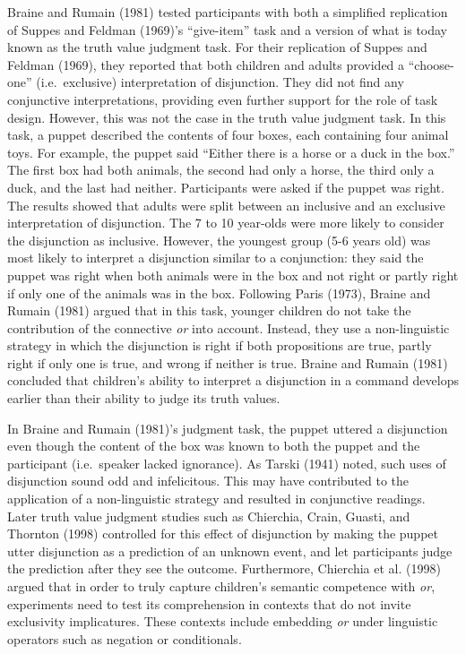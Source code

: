 \documentclass[,man,floatsintext]{apa6}
\begin{document}
Braine and Rumain (1981) tested participants with both a simplified replication of Suppes and Feldman (1969)'s \enquote{give-item} task and a version of what is today known as the truth value judgment task. For their replication of Suppes and Feldman (1969), they reported that both children and adults provided a \enquote{choose-one} (i.e.~exclusive) interpretation of disjunction. They did not find any conjunctive interpretations, providing even further support for the role of task design. However, this was not the case in the truth value judgment task. In this task, a puppet described the contents of four boxes, each containing four animal toys. For example, the puppet said \enquote{Either there is a horse or a duck in the box.} The first box had both animals, the second had only a horse, the third only a duck, and the last had neither. Participants were asked if the puppet was right. The results showed that adults were split between an inclusive and an exclusive interpretation of disjunction. The 7 to 10 year-olds were more likely to consider the disjunction as inclusive. However, the youngest group (5-6 years old) was most likely to interpret a disjunction similar to a conjunction: they said the puppet was right when both animals were in the box and not right or partly right if only one of the animals was in the box. Following Paris (1973), Braine and Rumain (1981) argued that in this task, younger children do not take the contribution of the connective \emph{or} into account. Instead, they use a non-linguistic strategy in which the disjunction is right if both propositions are true, partly right if only one is true, and wrong if neither is true. Braine and Rumain (1981) concluded that children's ability to interpret a disjunction in a command develops earlier than their ability to judge its truth values.

In Braine and Rumain (1981)'s judgment task, the puppet uttered a disjunction even though the content of the box was known to both the puppet and the participant (i.e.~speaker lacked ignorance). As Tarski (1941) noted, such uses of disjunction sound odd and infelicitous. This may have contributed to the application of a non-linguistic strategy and resulted in conjunctive readings. Later truth value judgment studies such as Chierchia, Crain, Guasti, and Thornton (1998) controlled for this effect of disjunction by making the puppet utter disjunction as a prediction of an unknown event, and let participants judge the prediction after they see the outcome. Furthermore, Chierchia et al. (1998) argued that in order to truly capture children's semantic competence with \emph{or}, experiments need to test its comprehension in contexts that do not invite exclusivity implicatures. These contexts include embedding \emph{or} under linguistic operators such as negation or conditionals.
\end{document}
